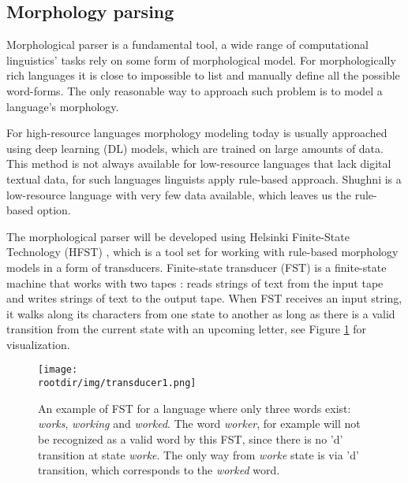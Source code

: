 \subsection{Morphology parsing}
\par Morphological parser is a fundamental tool, a wide range of computational linguistics' tasks  rely on some form of morphological model. For morphologically rich languages it is close to impossible to list and manually define all the possible word-forms. The only reasonable way to approach such problem is to model a language's morphology. 
\par For high-resource languages morphology modeling today is usually approached using deep learning (DL) models, which are trained on large amounts of data.  This method is not always available for low-resource languages that lack digital textual data, for such languages linguists apply rule-based approach.  Shughni is a low-resource language with very few data available, which leaves us the rule-based option.
\par The morphological parser will be developed using Helsinki Finite-State Technology (HFST) \parencite{linden_hfst_2009}, which is a tool set for working with rule-based morphology models in a form of transducers. Finite-state transducer (FST) is a finite-state machine that works with two tapes : reads strings of text from the input tape and writes strings of text to the output tape. When FST receives an input string, it walks along its characters from one state to another as long as there is a valid transition from the current state with an upcoming letter, see Figure \ref{fig:fst1} for visualization. 
\begin{figure}[!ht]
    \centering
    \texttt{[image: \\rootdir/img/transducer1.png]}
    \caption{An example of FST for a language where only three words exist: \textit{works}, \textit{working} and \textit{worked}. The word \textit{worker}, for example will not be recognized as a valid word by this FST, since there is no 'd' transition at state \textit{worke}. The only way from \textit{worke} state is via 'd' transition, which corresponds to the \textit{worked} word. \parencite{beesley_fst_2002}}
    \label{fig:fst1}
\end{figure}
